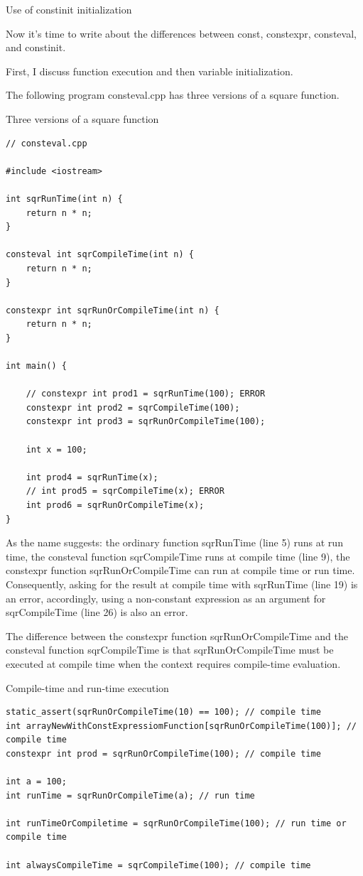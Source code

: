 \begin{center}
Use of constinit initialization
\end{center}

Now it’s time to write about the differences between const, constexpr, consteval, and constinit.

First, I discuss function execution and then variable initialization.


The following program consteval.cpp has three versions of a square function.

\noindent
Three versions of a square function
\begin{lstlisting}[style=styleCXX]
// consteval.cpp

#include <iostream>

int sqrRunTime(int n) {
	return n * n;
}

consteval int sqrCompileTime(int n) {
	return n * n;
}

constexpr int sqrRunOrCompileTime(int n) {
	return n * n;
}

int main() {

	// constexpr int prod1 = sqrRunTime(100); ERROR
	constexpr int prod2 = sqrCompileTime(100);
	constexpr int prod3 = sqrRunOrCompileTime(100);

	int x = 100;
	
	int prod4 = sqrRunTime(x);
	// int prod5 = sqrCompileTime(x); ERROR
	int prod6 = sqrRunOrCompileTime(x);
}
\end{lstlisting}

As the name suggests: the ordinary function sqrRunTime (line 5) runs at run time, the consteval function sqrCompileTime runs at compile time (line 9), the constexpr function sqrRunOrCompileTime can run at compile time or run time. Consequently, asking for the result at compile time with sqrRunTime (line 19) is an error, accordingly, using a non-constant expression as an argument for sqrCompileTime (line 26) is also an error.

The difference between the constexpr function sqrRunOrCompileTime and the consteval function sqrCompileTime is that sqrRunOrCompileTime must be executed at compile time when the context requires compile-time evaluation.

\noindent
Compile-time and run-time execution
\begin{lstlisting}[style=styleCXX]
static_assert(sqrRunOrCompileTime(10) == 100); // compile time
int arrayNewWithConstExpressiomFunction[sqrRunOrCompileTime(100)]; // compile time
constexpr int prod = sqrRunOrCompileTime(100); // compile time

int a = 100;
int runTime = sqrRunOrCompileTime(a); // run time

int runTimeOrCompiletime = sqrRunOrCompileTime(100); // run time or compile time

int alwaysCompileTime = sqrCompileTime(100); // compile time
\end{lstlisting}

